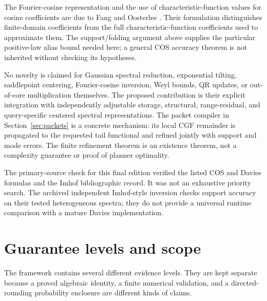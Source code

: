 \documentclass[11pt]{article}
\theoremstyle{definition}
\theoremstyle{remark}
\begin{document}
The Fourier-cosine representation and the use of characteristic-function
values for cosine coefficients are due to Fang and Oosterlee
\cite{FangOosterlee2008}.  Their formulation distinguishes finite-domain
coefficients from the full characteristic-function coefficients used to
approximate them.  The support/folding argument above supplies the particular
positive-law alias bound needed here; a general COS accuracy theorem is not
inherited without checking its hypotheses.

No novelty is claimed for Gaussian spectral reduction, exponential tilting,
saddlepoint centering, Fourier-cosine inversion, Weyl bounds, QR updates, or
out-of-core multiplication themselves.  The proposed contribution is their
explicit integration with independently adjustable storage, structural,
range-residual, and query-specific centered spectral representations.  The
packet compiler in Section~\ref{sec:packets} is a concrete mechanism: its
local CGF remainder is propagated to the requested tail functional and
refined jointly with support and mode errors.  The finite refinement theorem
is an existence theorem, not a complexity guarantee or proof of planner
optimality.

The primary-source check for this final edition verified the listed COS
and Davies formulas and the Imhof bibliographic record.  It was not an
exhaustive priority search.  The archived independent Imhof-style inversion
checks support accuracy on their tested heterogeneous spectra; they do not
provide a universal runtime comparison with a mature Davies implementation.

\section{Guarantee levels and scope}\label{sec:final-31}

The framework contains several different evidence levels.  They are kept
separate because a proved algebraic identity, a finite numerical validation,
and a directed-rounding probability enclosure are different kinds of claims.
\end{document}
